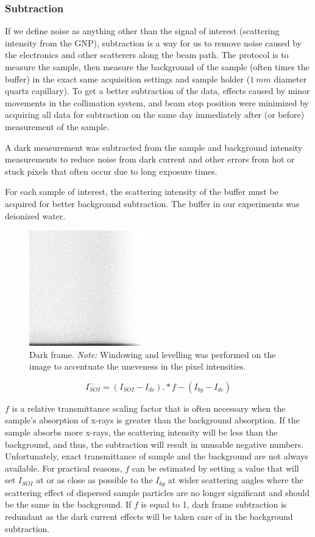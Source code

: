 \documentclass[10pt]{article}%
\begin{document}
\subsubsection{Subtraction}
If we define noise as anything other than the signal of interest (scattering intensity from the GNP), subtraction is a way for us to remove noise caused by the electronics and other scatterers along the beam path. The protocol is to measure the sample, then measure the background of the sample (often times the buffer) in the exact same acquisition settings and sample holder ($1~mm$ diameter quartz capillary). 
To get a better subtraction of the data, effects caused by minor movements in the collimation system, and beam stop position were minimized by acquiring all data for subtraction on the same day immediately after (or before) measurement of the sample.  

A dark measurement was subtracted from the sample and background intensity measurements to reduce noise from dark current and other errors from hot or stuck pixels that often occur due to long exposure times. 

For each sample of interest, the scattering intensity of the buffer must be acquired for better background subtraction. The buffer in our experiments was deionized water. 

\begin{figure}[ht]
\centering
\includegraphics[width=5cm]{images/darkcurrent2.png}
\caption{Dark frame. \textit{Note:} Windowing and levelling was performed on the image to accentuate the uneveness in the pixel intensities.}
\end{figure}
\begin{equation}
I_{SOI}^{-}=(I_{SOI}-I_{dc}).*f - (I_{bg}-I_{dc})
\end{equation}

$f$ is a relative transmittance scaling factor that is often necessary when the sample's absorption of x-rays is greater than the background absorption. If the sample absorbs more x-rays, the scattering intensity will be less than the background, and thus, the subtraction will result in unusable negative numbers. Unfortunately, exact transmittance of sample and the background are not always available. For practical reasons, $f$ can be estimated by setting a value that will set $I_{SOI}$ at or as close as possible to the $I_{bg}$ at wider scattering angles where the scattering effect of dispersed sample particles are no longer significant and should be the same in the background. If $f$ is equal to 1, dark frame subtraction is redundant as the dark current effects will be taken care of in the background subtraction. 
\end{document}
